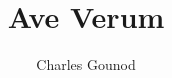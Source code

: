 \ifx\mxversion\undefined
 
 
 
\fi
 \title{Ave Verum}
 \author{Charles Gounod}
 \subtitle{\relax}
 \maketitle
\parindent 13mm
\normal
\relativeaccidentals
\def\nbinstruments{1}
\def\instrumenti{Orgue}
\def\instrumentii{Basse}
\def\instrumentiii{T\'{e}nor}
\def\instrumentiv{\vbox{\hsize\parindent\centerline{Soprano}\centerline{Alto}}}
\relax
\generalmeter{\allabreve}

\ifx\Transpose\undefined
  \def\Transpose{0}
  \def\Signature{-3}
\fi  
\generalsignature{\Signature}

\ifx\chorale\undefined
\else  
\fi  
\ninepoint

\def\Zsong{\zsong}

\stemcut

